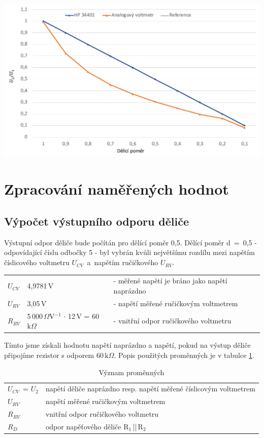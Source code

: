 \documentclass[a4paper,12pt]{article}   %
\newcommand{\ucv}{$U_{CV}$}
\newcommand{\un}{$U_{2}$}
\newcommand{\urv}{$U_{RV}$}
\newcommand{\rrv}{$R_{RV}$}
\newcommand{\rd}{$R_{D}$}
\begin{document}
\begin{graf}
    \centering
    \includegraphics[width = .8\textwidth]{graf1.pdf}
    \caption{Vynesené hodnoty číslicového a ručičkového voltmetru doplněné o referenční úsečku ideálních hodnot}
    \label{graf:hodnoty}
\end{graf}


\section{Zpracování naměřených hodnot}

\subsection{Výpočet výstupního odporu děliče}
Výstupní odpor děliče bude počítán pro dělící poměr 0,5. Dělící poměr d~=~0,5 - odpovídající číslu odbočky 5 - byl vybrán kvůli největšímu rozdílu mezi napětím číslicového voltmetru \ucv ~a~napětím ručičkového \urv.

\begin{table}[h!]
    \begin{tabular}{lll}
        \ucv    & 4,9781\,V &  - měřené napětí je bráno jako napětí naprázdno \\
        \urv    & 3,05\,V    &  - napětí měřené ručičkovým voltmetrem\\
        \rrv    & 5\,000\,$\Omega$V$^{-1}$ $\cdot$ 12\,V = 60\,$\textrm{k}\Omega$ & - vnitřní odpor ručičkového voltmetru\\
    \end{tabular}
\end{table}

Tímto jsme získali hodnotu napětí naprázdno a napětí, pokud na výstup děliče připojíme rezistor s odporem 60\,$\textrm{k}\Omega$. Popis použitých proměnných je v tabulce \ref{tab:prom}.
\begin{table}[h!]
    \centering
    \begin{tabular}{l|l}
        \ucv ~= \un & napětí děliče naprázdno resp. napětí měřené číslicovým voltmetrem \\
        \urv & napětí měřené ručičkovým voltmetrem \\
        \rrv & vnitřní odpor ručičkového voltmetru \\
        \rd  & odpor napěťového děliče R$_1$\,||\,R$_2$\\
    \end{tabular}
    \caption{Význam proměnných}
    \label{tab:prom}
\end{table}
\end{document}
